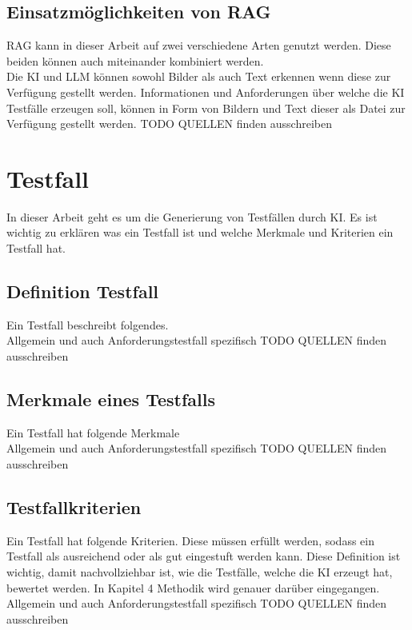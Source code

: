 \documentclass[12pt,toc=bib,toc=listof]{scrreprt}
\begin{document}
\subsection{Einsatzmöglichkeiten von RAG} %
\label{sec:einsatzmöglichkeitenVonRAG}
RAG kann in dieser Arbeit auf zwei verschiedene Arten genutzt werden. Diese beiden können auch miteinander kombiniert werden.\\
Die KI und LLM können sowohl Bilder als auch Text erkennen wenn diese zur Verfügung gestellt werden. Informationen und Anforderungen über welche die KI Testfälle erzeugen soll, können in Form von Bildern und Text dieser als Datei zur Verfügung gestellt werden.
TODO QUELLEN finden ausschreiben

\section{Testfall} %
\label{sec:testfall}
In dieser Arbeit geht es um die Generierung von Testfällen durch KI. Es ist wichtig zu erklären was ein Testfall ist und welche Merkmale und Kriterien ein Testfall hat. 

\subsection{Definition Testfall} %
\label{sec:definitionTestfall}
Ein Testfall beschreibt folgendes.\\
Allgemein und auch Anforderungstestfall spezifisch
TODO QUELLEN finden ausschreiben

\subsection{Merkmale eines Testfalls} %
\label{sec:merkmaleEinesTestfalls}
Ein Testfall hat folgende Merkmale\\
Allgemein und auch Anforderungstestfall spezifisch
TODO QUELLEN finden ausschreiben

\subsection{Testfallkriterien} %
\label{sec:testfallkriterien}
Ein Testfall hat folgende Kriterien. Diese müssen erfüllt werden, sodass ein Testfall als ausreichend oder als gut eingestuft werden kann. Diese Definition ist wichtig, damit nachvollziehbar ist, wie die Testfälle, welche die KI erzeugt hat, bewertet werden. In Kapitel 4 Methodik wird genauer darüber eingegangen.\\
Allgemein und auch Anforderungstestfall spezifisch
TODO QUELLEN finden ausschreiben
\end{document}
